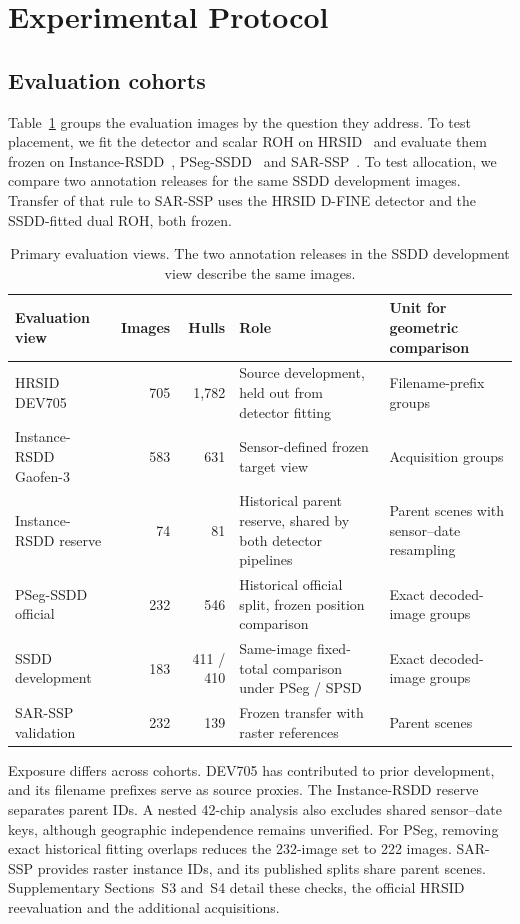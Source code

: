 \documentclass[journal]{IEEEtran}
\begin{document}
\section{Experimental Protocol}
\label{sec:protocol}

\subsection{Evaluation cohorts}

Table~\ref{tab:cohorts} groups the evaluation images by the question they address. To test placement, we fit the detector and scalar ROH on HRSID~\cite{hrsid} and evaluate them frozen on Instance-RSDD~\cite{rsdd}, PSeg-SSDD~\cite{ssdd} and SAR-SSP~\cite{slgsea}. To test allocation, we compare two annotation releases for the same SSDD development images. Transfer of that rule to SAR-SSP uses the HRSID D-FINE detector and the SSDD-fitted dual ROH, both frozen.

\begin{table}[t]
\centering
\caption{Primary evaluation views. The two annotation releases in the SSDD development view describe the same images.}
\label{tab:cohorts}
\footnotesize
\begin{tabular}{@{}lrrp{}p{}@{}}
\toprule
Evaluation view & Images & Hulls & Role & Unit for geometric comparison \\
\midrule
HRSID DEV705 & 705 & 1,782 & Source development, held out from detector fitting & Filename-prefix groups \\
Instance-RSDD Gaofen-3 & 583 & 631 & Sensor-defined frozen target view & Acquisition groups \\
Instance-RSDD reserve & 74 & 81 & Historical parent reserve, shared by both detector pipelines & Parent scenes with sensor--date resampling \\
PSeg-SSDD official & 232 & 546 & Historical official split, frozen position comparison & Exact decoded-image groups \\
SSDD development & 183 & 411 / 410 & Same-image fixed-total comparison under PSeg / SPSD & Exact decoded-image groups \\
SAR-SSP validation & 232 & 139 & Frozen transfer with raster references & Parent scenes \\
\bottomrule
\end{tabular}
\end{table}

Exposure differs across cohorts. DEV705 has contributed to prior development, and its filename prefixes serve as source proxies. The Instance-RSDD reserve separates parent IDs. A nested 42-chip analysis also excludes shared sensor--date keys, although geographic independence remains unverified. For PSeg, removing exact historical fitting overlaps reduces the 232-image set to 222 images. SAR-SSP provides raster instance IDs, and its published splits share parent scenes. Supplementary Sections~S3 and~S4 detail these checks, the official HRSID reevaluation and the additional acquisitions.
\end{document}
